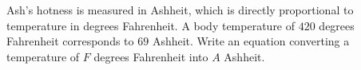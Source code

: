 Ash's hotness is measured in Ashheit, which is directly proportional to temperature in degrees Fahrenheit. A body temperature of $420$ degrees Fahrenheit corresponds to $69$ Ashheit. Write an equation converting a temperature of $F$ degrees Fahrenheit into $A$ Ashheit.
